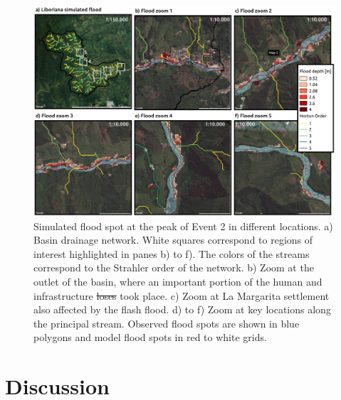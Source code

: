 \documentclass[hess, manuscript]{copernicus}
\providecommand{\DIFadd}[1]{{\protect\color{blue}\uwave{#1}}} %
\providecommand{\DIFdel}[1]{{\protect\color{red}\sout{#1}}}                      %
\providecommand{\DIFaddend}{} %
\providecommand{\DIFaddFL}[1]{\DIFadd{#1}} %
\providecommand{\DIFdelFL}[1]{\DIFdel{#1}} %
\providecommand{\DIFaddbeginFL}{} %
\providecommand{\DIFaddendFL}{} %
\providecommand{\DIFdelbeginFL}{} %
\providecommand{\DIFdelendFL}{} %
\begin{document}
\DIFaddend \begin{figure}[t!]
\centering
 \includegraphics[width=12cm]{Figures/Manchas2.png}
 \caption{Simulated flood spot at the peak of Event 2 in different locations. a) Basin drainage network. White squares correspond to regions of interest highlighted in panes b) to f). The colors of the streams correspond to the Strahler order of the network. b) Zoom at the outlet of the basin, where an important portion of the human and infrastructure \DIFdelbeginFL \DIFdelFL{loses }\DIFdelendFL \DIFaddbeginFL \DIFaddFL{losses }\DIFaddendFL took place. c) Zoom at La Margarita settlement also affected by the flash flood. d) to f) Zoom at key locations along the principal stream. Observed flood spots are shown in blue polygons and model flood spots in red to white grids.}
    \label{fig:SimFloodSpots}
\end{figure}


\section{Discussion}
\label{sec:discussion}
\end{document}
